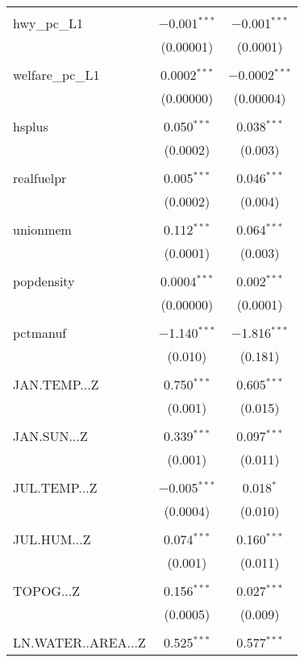 \begin{table}[!htbp]
\begin{tabular}{@{\extracolsep{5pt}}lcc}
  & & \\ 
 hwy\_pc\_L1 & $-$0.001$^{***}$ & $-$0.001$^{***}$ \\ 
  & (0.00001) & (0.0001) \\ 
  & & \\ 
 welfare\_pc\_L1 & 0.0002$^{***}$ & $-$0.0002$^{***}$ \\ 
  & (0.00000) & (0.00004) \\ 
  & & \\ 
 hsplus & 0.050$^{***}$ & 0.038$^{***}$ \\ 
  & (0.0002) & (0.003) \\ 
  & & \\ 
 realfuelpr & 0.005$^{***}$ & 0.046$^{***}$ \\ 
  & (0.0002) & (0.004) \\ 
  & & \\ 
 unionmem & 0.112$^{***}$ & 0.064$^{***}$ \\ 
  & (0.0001) & (0.003) \\ 
  & & \\ 
 popdensity & 0.0004$^{***}$ & 0.002$^{***}$ \\ 
  & (0.00000) & (0.0001) \\ 
  & & \\ 
 pctmanuf & $-$1.140$^{***}$ & $-$1.816$^{***}$ \\ 
  & (0.010) & (0.181) \\ 
  & & \\ 
 JAN.TEMP...Z & 0.750$^{***}$ & 0.605$^{***}$ \\ 
  & (0.001) & (0.015) \\ 
  & & \\ 
 JAN.SUN...Z & 0.339$^{***}$ & 0.097$^{***}$ \\ 
  & (0.001) & (0.011) \\ 
  & & \\ 
 JUL.TEMP...Z & $-$0.005$^{***}$ & 0.018$^{*}$ \\ 
  & (0.0004) & (0.010) \\ 
  & & \\ 
 JUL.HUM...Z & 0.074$^{***}$ & 0.160$^{***}$ \\ 
  & (0.001) & (0.011) \\ 
  & & \\ 
 TOPOG...Z & 0.156$^{***}$ & 0.027$^{***}$ \\ 
  & (0.0005) & (0.009) \\ 
  & & \\ 
 LN.WATER..AREA...Z & 0.525$^{***}$ & 0.577$^{***}$ \\ 

\end{tabular}
\end{table}
